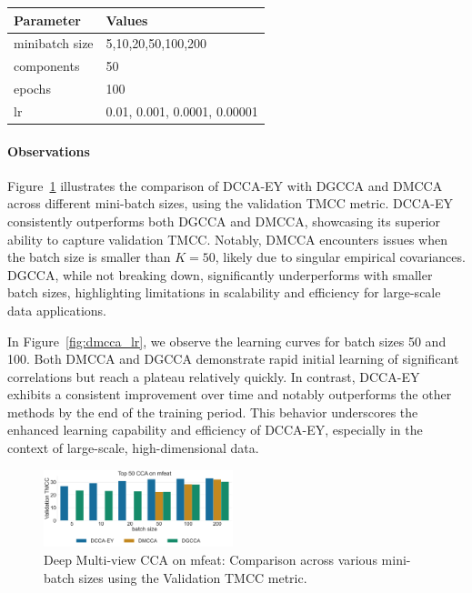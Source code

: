 \begin{table}[h!]
    \centering
    \begin{tabular}{|l|l|}
        \hline Parameter      & Values                       \\
        \hline minibatch size & 5,10,20,50,100,200           \\
        \hline components     & 50                           \\
        \hline epochs         & 100                          \\
        \hline lr             & 0.01, 0.001, 0.0001, 0.00001 \\
        \hline
    \end{tabular}
\end{table}

\paragraph{Observations}
Figure~\ref{fig:dmcca_corr} illustrates the comparison of DCCA-EY with DGCCA and DMCCA across different mini-batch sizes, using the validation TMCC metric. DCCA-EY consistently outperforms both DGCCA and DMCCA, showcasing its superior ability to capture validation TMCC. Notably, DMCCA encounters issues when the batch size is smaller than $K=50$, likely due to singular empirical covariances. DGCCA, while not breaking down, significantly underperforms with smaller batch sizes, highlighting limitations in scalability and efficiency for large-scale data applications.

In Figure~\ref{fig:dmcca_lr}, we observe the learning curves for batch sizes 50 and 100. Both DMCCA and DGCCA demonstrate rapid initial learning of significant correlations but reach a plateau relatively quickly. In contrast, DCCA-EY exhibits a consistent improvement over time and notably outperforms the other methods by the end of the training period. This behavior underscores the enhanced learning capability and efficiency of DCCA-EY, especially in the context of large-scale, high-dimensional data.

\begin{figure}
    \centering
    \includegraphics[width=0.49\textwidth]{figures/DMCCA/mfeat_models_different_batch_sizes}
    \caption{Deep Multi-view CCA on mfeat: Comparison across various mini-batch sizes using the Validation TMCC metric.}\label{fig:dmcca_corr}
\end{figure}


